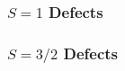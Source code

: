 \subsubsection{$S=1$ Defects}



\subsubsection{$S=3/2$ Defects}






\cite{Eddy2009}


\cite{CASADY19961409}


\cite{10.1093/nsr/nwab122}


\cite{Son2021}

\cite{PhysRevApplied.6.034001}

